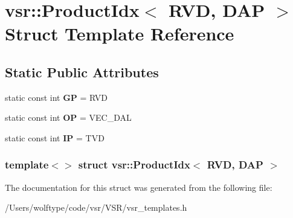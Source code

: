 \hypertarget{structvsr_1_1_product_idx_3_01_r_v_d_00_01_d_a_p_01_4}{\section{vsr\-:\-:Product\-Idx$<$ R\-V\-D, D\-A\-P $>$ Struct Template Reference}
\label{structvsr_1_1_product_idx_3_01_r_v_d_00_01_d_a_p_01_4}
}
\subsection*{Static Public Attributes}
\begin{DoxyCompactItemize}
\item 
\hypertarget{structvsr_1_1_product_idx_3_01_r_v_d_00_01_d_a_p_01_4_a73ff818ca30c98cdd63bd4d4baf10dcc}{static const int {\bfseries G\-P} = R\-V\-D}\label{structvsr_1_1_product_idx_3_01_r_v_d_00_01_d_a_p_01_4_a73ff818ca30c98cdd63bd4d4baf10dcc}

\item 
\hypertarget{structvsr_1_1_product_idx_3_01_r_v_d_00_01_d_a_p_01_4_ac8e76ca21225d75057b4d3a8d96724f9}{static const int {\bfseries O\-P} = V\-E\-C\-\_\-\-D\-A\-L}\label{structvsr_1_1_product_idx_3_01_r_v_d_00_01_d_a_p_01_4_ac8e76ca21225d75057b4d3a8d96724f9}

\item 
\hypertarget{structvsr_1_1_product_idx_3_01_r_v_d_00_01_d_a_p_01_4_a20904c03268dc4a7344c5307748528b6}{static const int {\bfseries I\-P} = T\-V\-D}\label{structvsr_1_1_product_idx_3_01_r_v_d_00_01_d_a_p_01_4_a20904c03268dc4a7344c5307748528b6}

\end{DoxyCompactItemize}
\subsubsection*{template$<$$>$ struct vsr\-::\-Product\-Idx$<$ R\-V\-D, D\-A\-P $>$}



The documentation for this struct was generated from the following file\-:\begin{DoxyCompactItemize}
\item 
/\-Users/wolftype/code/vsr/\-V\-S\-R/vsr\-\_\-templates.\-h\end{DoxyCompactItemize}
